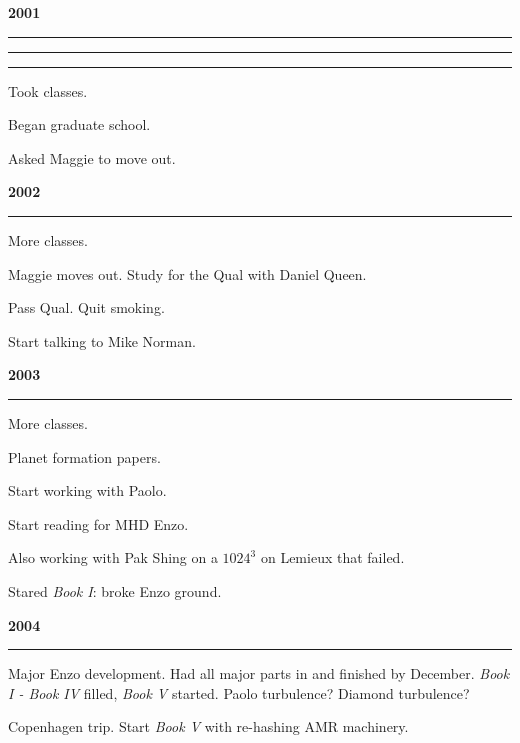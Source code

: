 \documentclass[10pt]{article}
\begin{document}
\begin{center}
\end{center}
\begin{center}{\bf 2001}\end{center}

\noindent\rule[3pt]{\textwidth}{.1mm}

\noindent\rule[3pt]{\textwidth}{.1mm}


\noindent\rule[3pt]{\textwidth}{.1mm}

Took classes.

 Began graduate school.

 Asked Maggie to move out.

\begin{center}{\bf 2002}\end{center}

\noindent\rule[3pt]{\textwidth}{.1mm}

More classes.

 Maggie moves out.  Study for the Qual with Daniel Queen.

 Pass Qual.  Quit smoking.

 Start talking to Mike Norman.

\begin{center}{\bf 2003}\end{center}

\noindent\rule[3pt]{\textwidth}{.1mm}

More classes.

 Planet formation papers.

 Start working with Paolo.

 Start reading for MHD Enzo.

Also working with Pak Shing on a $1024^3$ on Lemieux that failed.

 Stared \emph{Book I}: broke Enzo ground.

\begin{center}{\bf 2004}\end{center}

\noindent\rule[3pt]{\textwidth}{.1mm}

Major Enzo development.  Had all major parts in and finished by December.
\emph{Book I - Book IV} filled, \emph{Book V} started.  
Paolo turbulence?  Diamond turbulence?

 Copenhagen trip. Start \emph{Book V} with re-hashing AMR machinery.
\end{document}
